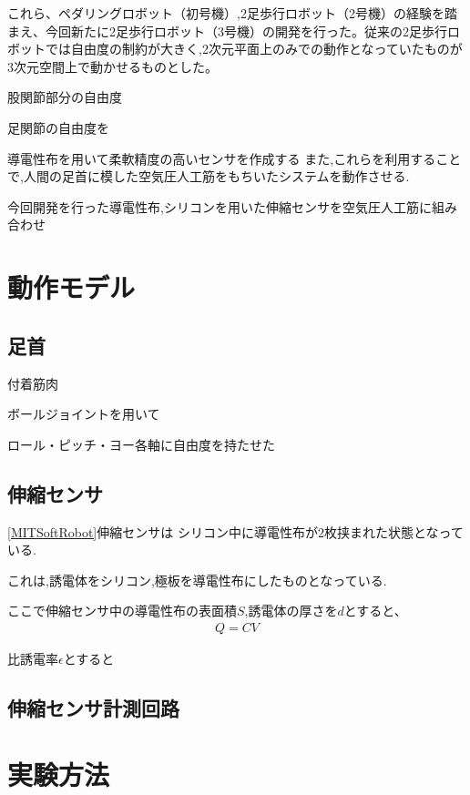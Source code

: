 これら、ペダリングロボット（初号機）,2足歩行ロボット（2号機）の経験を踏まえ、今回新たに2足歩行ロボット（3号機）の開発を行った。従来の2足歩行ロボットでは自由度の制約が大きく,2次元平面上のみでの動作となっていたものが3次元空間上で動かせるものとした。

股関節部分の自由度

足関節の自由度を

導電性布を用いて柔軟精度の高いセンサを作成する
また,これらを利用することで,人間の足首に模した空気圧人工筋をもちいたシステムを動作させる.

今回開発を行った導電性布,シリコンを用いた伸縮センサを空気圧人工筋に組み合わせ
\section{動作モデル}
\subsection{足首}
付着筋肉

ボールジョイントを用いて

ロール・ピッチ・ヨー各軸に自由度を持たせた
\subsection{伸縮センサ}
\ref{MITSoftRobot}伸縮センサは
シリコン中に導電性布が2枚挟まれた状態となっている.

これは,誘電体をシリコン,極板を導電性布にしたものとなっている.

ここで伸縮センサ中の導電性布の表面積$S$,誘電体の厚さを$d$とすると、
\begin{eqnarray}
    Q=CV
\end{eqnarray}

比誘電率$\epsilon$とすると

\subsection{伸縮センサ計測回路}
\section{実験方法}
